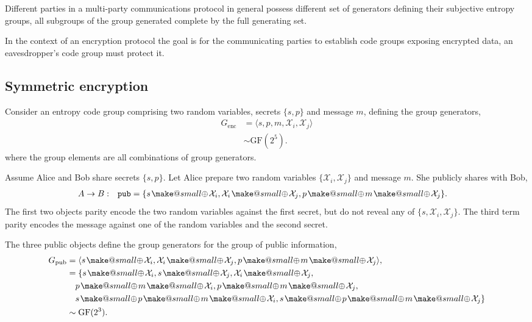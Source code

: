 \documentclass[twocolumn, aps, amsmath, amssymb, nofootinbib, superscriptaddress, longbibliography, doublefloatfix, table-of-contents, eqsecnum, rmp]{revtex4-2}
\makeatletter
\newcommand{\soplus}{{{\hspace{1pt}}{\mathbin{\mathpalette\make@small{\mathbin\oplus}}}}{\hspace{1pt}}}
\newcommand{\make@small}[2]{%
  \vcenter{\hbox{%
    \scalebox{0.6}{$\m@th#1#2$}%
  }}%
}
\makeatother
\begin{document}
Different parties in a multi-party communications protocol in general possess different set of generators defining their subjective entropy groups, all subgroups of the group generated complete by the full generating set.

In the context of an encryption protocol the goal is for the communicating parties to establish code groups exposing encrypted data, an eavesdropper's code group must protect it.

\subsection{Symmetric encryption}

Consider an entropy code group comprising two random variables, secrets $\{s,p\}$ and message $m$, defining the group generators,
\begin{align}
	G_\mathrm{enc} &= \langle s,p,m,\mathcal{X}_i,\mathcal{X}_j \rangle\nonumber\\
	&\sim \mathrm{GF}(2^5).
\end{align}
where the group elements are all combinations of group generators.

Assume Alice and Bob share secrets $\{s,p\}$. Let Alice prepare two random variables $\{\mathcal{X}_i,\mathcal{X}_j\}$ and message $m$. She publicly shares with Bob,
\begin{align}
	A\to B:\quad &\mathtt{pub} = \{s\soplus \mathcal{X}_i, \mathcal{X}_i \soplus \mathcal{X}_j, p \soplus m\soplus\mathcal{X}_j\}.
\end{align}
The first two objects parity encode the two random variables against the first secret, but do not reveal any of $\{s,\mathcal{X}_i,\mathcal{X}_j\}$. The third term parity encodes the message against one of the random variables and the second secret.

The three public objects define the group generators for the group of public information,
\begin{align}
	G_\mathrm{pub} &= \langle s\soplus \mathcal{X}_i, \mathcal{X}_i \soplus \mathcal{X}_j, p \soplus m\soplus\mathcal{X}_j\rangle,\nonumber\\
	&= \{s\soplus \mathcal{X}_i, s\soplus \mathcal{X}_j, \mathcal{X}_i \soplus \mathcal{X}_j,\nonumber\\
	&\quad p \soplus m\soplus\mathcal{X}_i, p \soplus m\soplus\mathcal{X}_j, \nonumber\\
	&\quad s\soplus p \soplus m\soplus\mathcal{X}_i, s\soplus p \soplus m\soplus\mathcal{X}_j\}\nonumber\\
	&\sim \mathrm{GF}(2^3).
\end{align}
\end{document}
